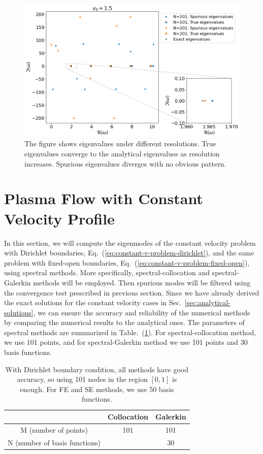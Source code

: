 \begin{figure} [htbp]
	\centering
	\includegraphics[width=\textwidth]{figures/convergence-test.png}
	\caption{The figure shows eigenvalues under different resolutions. True eigenvalues converge to the analytical eigenvalues as resolution increases. Spurious eigenvalues diverges with no obvious pattern.}
	\label{fig:convergence-test}
\end{figure}

\section{Plasma Flow with Constant Velocity Profile}
In this section, we will compute the eigenmodes of the constant velocity problem with Dirichlet boundaries, Eq.~(\ref{eq:constant-v-problem-dirichlet}), and the same problem with fixed-open boundaries, Eq.~(\ref{eq:constant-v-problem-fixed-open}), using spectral methods. More specifically, spectral-collocation and spectral-Galerkin methods will be employed. Then spurious modes will be filtered using the convergence test prescribed in previous section. Since we have already derived the exact solutions for the constant velocity cases in Sec.~\ref{sec:analytical-solutions}, we can ensure the accuracy and reliability of the numerical methods by comparing the numerical results to the analytical ones. The parameters of spectral methods are summarized in Table.~(\ref{table:parameters}). For spectral-collocation method, we use 101 points, and for spectral-Galerkin method we use 101 points and 30 basis functions.

\begin{table} [htbp]
	\centering
	\caption{With Dirichlet boundary condition, all methods have good accuracy, so using 101 nodes in the region $[0,1]$ is enough. For FE and SE methods, we use 50 basis functions.}
	\begin{tabular}{|c|c|c|}
		\hline
		                              & Collocation & Galerkin \\
		\hline
		M (number of points)          & 101         & 101      \\
		\hline
		N (number of basis functions) &             & 30       \\
		\hline
	\end{tabular}
	\label{table:parameters}
\end{table}

